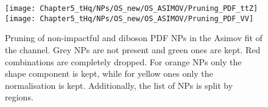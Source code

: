 
\begin{figure}[h]
  \centering
  \texttt{[image: Chapter5\_tHq/NPs/OS\_new/OS\_ASIMOV/Pruning\_PDF\_ttZ]} 
  \texttt{[image: Chapter5\_tHq/NPs/OS\_new/OS\_ASIMOV/Pruning\_PDF\_VV]}
   \caption{Pruning of non-impactful \ttZ and diboson PDF NPs in the Asimov fit of the \dilepOStau channel. Grey NPs are 
   not present and green ones are kept. Red combinations are completely dropped. For orange NPs only the shape 
   component is kept, while for yellow ones only the normalisation is kept. Additionally, the list of NPs is split by regions.}
  \label{fig:Appendix:AdditionalResults:OS:Asimov:Pruning:ttZPDF}
\end{figure}




\FloatBarrier


